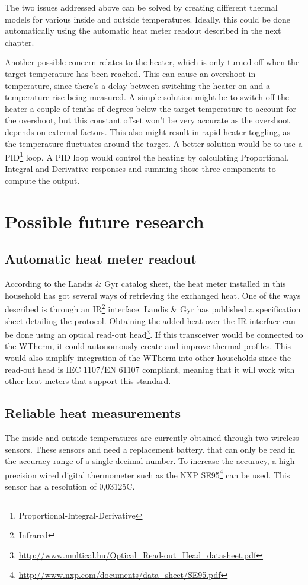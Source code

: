 \documentclass[12pt,a4paper,final]{report}
\begin{document}
The two issues addressed above can be solved by creating different thermal models for various inside and outside temperatures. Ideally, this could be done automatically using the automatic heat meter readout described in the next chapter.

Another possible concern relates to the heater, which is only turned off when the target temperature has been reached. This can cause an overshoot in temperature, since there's a delay between switching the heater on and a temperature rise being measured. A simple solution might be to switch off the heater a couple of tenths of degrees below the target temperature to account for the overshoot, but this constant offset won't be very accurate as the overshoot depends on external factors. This also might result in rapid heater toggling, as the temperature fluctuates around the target. A better solution would be to use a PID\footnote{Proportional-Integral-Derivative} loop. A PID loop would control the heating by calculating Proportional, Integral and Derivative responses and summing those three components to compute the output\cite{PIDexplained}.


\chapter{Possible future research}
\section{Automatic heat meter readout}
According to the Landis \& Gyr catalog sheet, the heat meter installed in this household has got several ways of retrieving the exchanged heat\cite{landisgyrcat14}. One of the ways described is through an IR\footnote{Infrared} interface. Landis \& Gyr has published a specification sheet\cite{landisgyrser14} detailing the protocol. Obtaining the added heat over the IR interface can be done using an optical read-out head\footnote{\url{http://www.multical.hu/Optical_Read-out_Head_datasheet.pdf}}. If this transceiver would be connected to the WTherm, it could autonomously create and improve thermal profiles. This would also simplify integration of the WTherm into other households since the read-out head is IEC 1107/EN 61107 compliant, meaning that it will work with other heat meters that support this standard.

\section{Reliable heat measurements}
The inside and outside temperatures are currently obtained through two wireless sensors. These sensors and need a replacement battery. that can only be read in the accuracy range of a single decimal number. To increase the accuracy, a high-precision wired digital thermometer such as the NXP SE95\footnote{\url{http://www.nxp.com/documents/data_sheet/SE95.pdf}} can be used. This sensor has a resolution of 0,03125\degree{}C.
\end{document}
